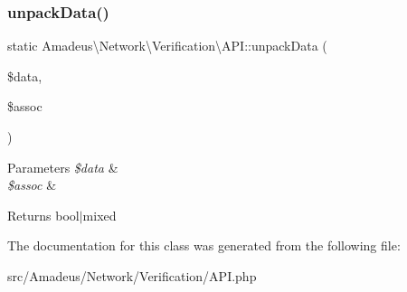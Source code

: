 \subsubsection{\texorpdfstring{unpack\+Data()}{unpackData()}}
{\footnotesize\ttfamily static Amadeus\textbackslash{}\+Network\textbackslash{}\+Verification\textbackslash{}\+A\+P\+I\+::unpack\+Data (\begin{DoxyParamCaption}\item[{}]{\$data,  }\item[{}]{\$assoc }\end{DoxyParamCaption})\hspace{0.3cm}{\ttfamily [static]}}


\begin{DoxyParams}{Parameters}
{\em \$data} & \\
\hline
{\em \$assoc} & \\
\hline
\end{DoxyParams}
\begin{DoxyReturn}{Returns}
bool$\vert$mixed 
\end{DoxyReturn}


The documentation for this class was generated from the following file\+:\begin{DoxyCompactItemize}
\item 
src/\+Amadeus/\+Network/\+Verification/A\+P\+I.\+php\end{DoxyCompactItemize}
